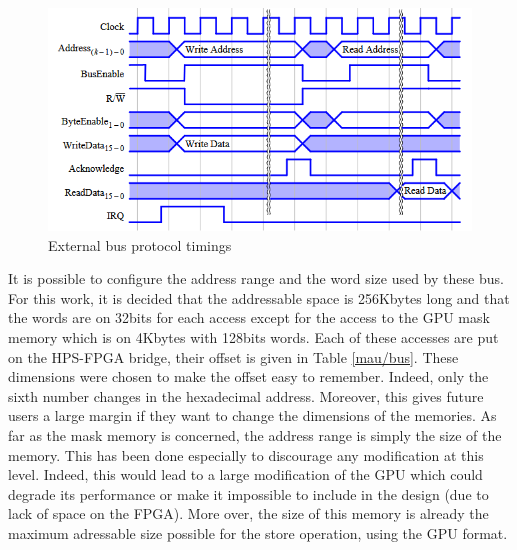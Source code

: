 \begin{figure}[ht!]
    \center
    \includegraphics[scale=0.8]{"Chapter5-MAU_CTRLU/res/external_bus_timings.PNG"}
    \caption{External bus protocol timings}
    \label{fig:mau/bus_bridge_protocol}
\end{figure}

It is possible to configure the address range and the word size used by these bus. For this work, 
it is decided that the 
addressable space is 256Kbytes long and that the words are on 32bits for each access except for the 
access to the GPU mask memory which is on 4Kbytes with 128bits words. Each of these accesses are 
put on the HPS-FPGA bridge, their offset is given in Table \ref{mau/bus}. These dimensions were 
chosen to make the offset easy to remember. Indeed, only the sixth number changes in the 
hexadecimal address. Moreover, this gives future users a large margin if they want to change the 
dimensions of the memories. As far as the mask memory is concerned, the address range is simply the 
size of the memory. This has been done especially to discourage any modification at this level. 
Indeed, this would lead to a large modification of the GPU which could degrade its performance or 
make it impossible to include in the design (due to lack of space on the FPGA). More over, the size
of this memory is already the maximum adressable size possible for the store operation, using the
GPU format.

